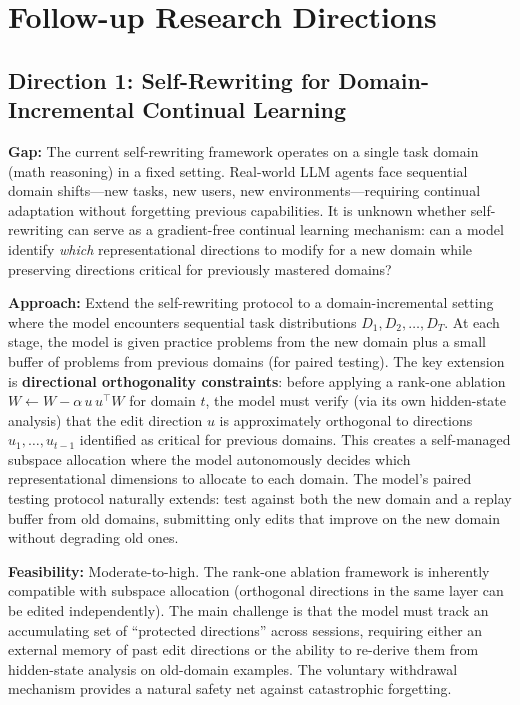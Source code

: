 \documentclass[11pt,a4paper]{article}
\begin{document}
\section{Follow-up Research Directions}

\subsection{Direction 1: Self-Rewriting for Domain-Incremental Continual Learning}
\textbf{Gap:} The current self-rewriting framework operates on a single task domain (math reasoning) in a fixed setting. Real-world LLM agents face sequential domain shifts---new tasks, new users, new environments---requiring continual adaptation without forgetting previous capabilities. It is unknown whether self-rewriting can serve as a gradient-free continual learning mechanism: can a model identify \emph{which} representational directions to modify for a new domain while preserving directions critical for previously mastered domains?

\textbf{Approach:} Extend the self-rewriting protocol to a domain-incremental setting where the model encounters sequential task distributions $D_1, D_2, \ldots, D_T$. At each stage, the model is given practice problems from the new domain plus a small buffer of problems from previous domains (for paired testing). The key extension is \textbf{directional orthogonality constraints}: before applying a rank-one ablation $W \leftarrow W - \alpha\, u\, u^\top W$ for domain $t$, the model must verify (via its own hidden-state analysis) that the edit direction $u$ is approximately orthogonal to directions $u_1, \ldots, u_{t-1}$ identified as critical for previous domains. This creates a self-managed subspace allocation where the model autonomously decides which representational dimensions to allocate to each domain. The model's paired testing protocol naturally extends: test against both the new domain and a replay buffer from old domains, submitting only edits that improve on the new domain without degrading old ones.

\textbf{Feasibility:} Moderate-to-high. The rank-one ablation framework is inherently compatible with subspace allocation (orthogonal directions in the same layer can be edited independently). The main challenge is that the model must track an accumulating set of ``protected directions'' across sessions, requiring either an external memory of past edit directions or the ability to re-derive them from hidden-state analysis on old-domain examples. The voluntary withdrawal mechanism provides a natural safety net against catastrophic forgetting.
\end{document}

